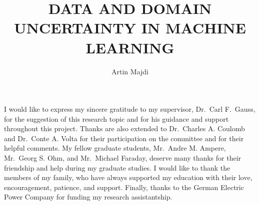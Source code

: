 \title{DATA AND DOMAIN UNCERTAINTY IN MACHINE LEARNING}
\author{Artin Majdi}
%
\fancyhf{}
\cfoot{\thepage}
\chead{\th}
%
\maketitle%
\makeapproval%
\makestatement%
%
\begin{acknowledgments}
I would like to express my sincere gratitude to my supervisor,
Dr.\ Carl F.\ Gauss, for the suggestion of this research topic and for his
guidance and support throughout this project.
Thanks are also extended to Dr.\ Charles A. Coulomb and Dr.\ Conte A. Volta
for their participation on the committee and for their helpful comments.
My fellow graduate students, Mr.\ Andre M. Ampere, Mr.\ Georg S. Ohm, and
Mr.\ Michael Faraday, deserve many thanks for their friendship and help during
my graduate studies.
I would like to thank the members of my family, who have always supported my
education with their love, encouragement, patience, and support.
Finally, thanks to the German Electric Power Company for funding my research
assistantship.
\end{acknowledgments}
%
\tableofcontents
\listoffigures
\newpage
\listoftables
\newpage

\begin{abstract}  \end{abstract}	%
